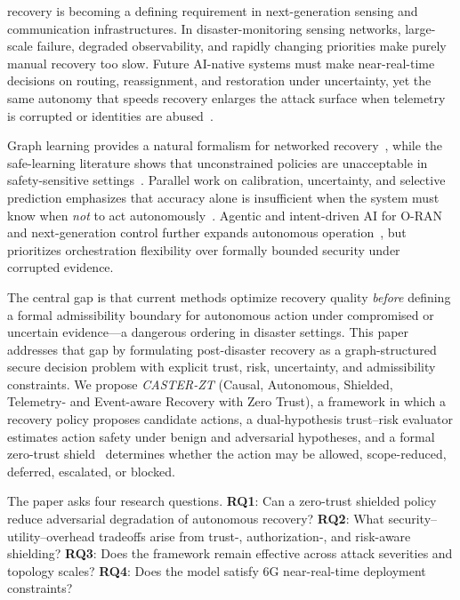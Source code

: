\documentclass[lettersize,journal]{IEEEtran}
\begin{document}
 recovery is becoming a defining requirement in next-generation sensing and communication infrastructures.
In disaster-monitoring sensing networks, large-scale failure, degraded observability, and rapidly changing priorities make purely manual recovery too slow.
Future AI-native systems must make near-real-time decisions on routing, reassignment, and restoration under uncertainty, yet the same autonomy that speeds recovery enlarges the attack surface when telemetry is corrupted or identities are abused~\cite{amodei2016concrete,rose2020nist}.

Graph learning provides a natural formalism for networked recovery~\cite{kipf2017gcn,hamilton2017graphsage,velickovic2018gat}, while the safe-learning literature shows that unconstrained policies are unacceptable in safety-sensitive settings~\cite{garcia2015saferl,achiam2017cpo,alshiekh2018shielding}.
Parallel work on calibration, uncertainty, and selective prediction emphasizes that accuracy alone is insufficient when the system must know when \emph{not} to act autonomously~\cite{gal2016dropout,angelopoulos2023conformal}.
Agentic and intent-driven AI for O-RAN and next-generation control further expands autonomous operation~\cite{toward_autonomous_oran_2026,oran_official_architecture}, but prioritizes orchestration flexibility over formally bounded security under corrupted evidence.

The central gap is that current methods optimize recovery quality \emph{before} defining a formal admissibility boundary for autonomous action under compromised or uncertain evidence---a dangerous ordering in disaster settings.
This paper addresses that gap by formulating post-disaster recovery as a graph-structured secure decision problem with explicit trust, risk, uncertainty, and admissibility constraints.
We propose \emph{CASTER-ZT} (Causal, Autonomous, Shielded, Telemetry- and Event-aware Recovery with Zero Trust), a framework in which a recovery policy proposes candidate actions, a dual-hypothesis trust--risk evaluator estimates action safety under benign and adversarial hypotheses, and a formal zero-trust shield~\cite{rose2020nist} determines whether the action may be allowed, scope-reduced, deferred, escalated, or blocked.

The paper asks four research questions.
\textbf{RQ1}: Can a zero-trust shielded policy reduce adversarial degradation of autonomous recovery?
\textbf{RQ2}: What security--utility--overhead tradeoffs arise from trust-, authorization-, and risk-aware shielding?
\textbf{RQ3}: Does the framework remain effective across attack severities and topology scales?
\textbf{RQ4}: Does the model satisfy 6G near-real-time deployment constraints?
\end{document}
